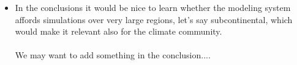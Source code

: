 \documentclass[12pt]{article}\usepackage{amsmath, amssymb, graphicx, array}
\begin{document}
\begin{itemize}
\item In the conclusions it would be nice to learn whether the modeling system affords simulations over very large regions, let's say subcontinental, which would make it relevant also for the climate community. \\ \\
We may want to add something in the conclusion....
\end{itemize}
\end{document}
